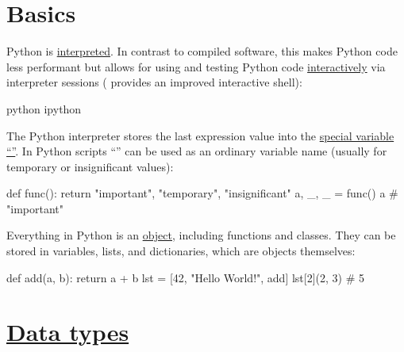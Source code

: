 \documentclass[rules]{cheatsheet}
\begin{document}
\section{Basics}

Python is \href{https://docs.python.org/3/glossary.html#term-interpreted}{interpreted}. In contrast to compiled software, this makes Python code less performant but allows for using and testing Python code \href{https://docs.python.org/3/glossary.html#term-interactive}{interactively} via interpreter sessions (\href{https://ipython.org/}{} provides an improved interactive shell):
\begin{bash}
  python
  ipython
\end{bash}

The Python interpreter stores the last expression value into the \href{https://dbader.org/blog/meaning-of-underscores-in-python#single-underscore}{special variable \enquote{{\pyinline{_}}}}. In Python scripts \enquote{{\pyinline{_}}} can be used as an ordinary variable name (usually for temporary or insignificant values):
\begin{python}
  def func():
    return "important", "temporary", "insignificant"
  a, _, _ = func()
  a # "important"
\end{python}

Everything in Python is an \href{https://docs.python.org/3/reference/datamodel.html#objects-values-and-types}{object}, including functions and classes. They can be stored in variables, lists, and dictionaries, which are objects themselves:
\begin{python}
  def add(a, b):
    return a + b
  lst = [42, "Hello World!", add]
  lst[2](2, 3) # 5
\end{python}

\section{\href{https://docs.python.org/3/library/datatypes.html}{Data types}}
\end{document}
